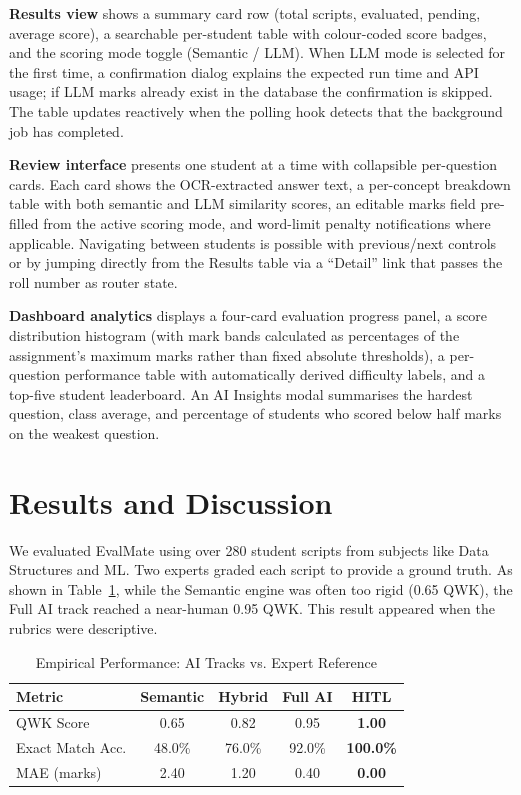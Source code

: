 \documentclass[conference]{IEEEtran}
\begin{document}
\textbf{Results view} shows a summary card row (total scripts,
evaluated, pending, average score), a searchable per-student table
with colour-coded score badges, and the scoring mode toggle
(Semantic / LLM). When LLM mode is selected for the first time,
a confirmation dialog explains the expected run time and API usage;
if LLM marks already exist in the database the confirmation is
skipped. The table updates reactively when the polling hook detects
that the background job has completed.

\textbf{Review interface} presents one student at a time with
collapsible per-question cards. Each card shows the OCR-extracted
answer text, a per-concept breakdown table with both semantic and
LLM similarity scores, an editable marks field pre-filled from the
active scoring mode, and word-limit penalty notifications where
applicable. Navigating between students is possible with previous/next
controls or by jumping directly from the Results table via a
``Detail'' link that passes the roll number as router state.

\textbf{Dashboard analytics} displays a four-card evaluation
progress panel, a score distribution histogram (with mark bands
calculated as percentages of the assignment's maximum marks rather
than fixed absolute thresholds), a per-question performance table
with automatically derived difficulty labels, and a top-five
student leaderboard. An AI Insights modal summarises the hardest
question, class average, and percentage of students who scored
below half marks on the weakest question.

\section{Results and Discussion}

We evaluated EvalMate using over 280 student scripts from subjects like Data Structures and ML. Two experts graded each script to provide a ground truth. As shown in Table~\ref{tab:overall}, while the Semantic engine was often too rigid (0.65 QWK), the Full AI track reached a near-human 0.95 QWK. This result appeared when the rubrics were descriptive.
\vspace{-1ex}
\begin{table}[H]
  \caption{Empirical Performance: AI Tracks vs. Expert Reference}
  \label{tab:overall}
  \centering
  \begin{tabular}{lcccc}
    \toprule
    \textbf{Metric} & \textbf{Semantic} & \textbf{Hybrid} & \textbf{Full AI} & \textbf{HITL} \\
    \midrule
    QWK Score          & 0.65   & 0.82   & 0.95   & \textbf{1.00} \\
    Exact Match Acc.   & 48.0\% & 76.0\% & 92.0\% & \textbf{100.0\%} \\
    MAE (marks)        & 2.40   & 1.20   & 0.40   & \textbf{0.00} \\
    \bottomrule
  \end{tabular}
\end{table}
\vspace{-1ex}
\end{document}
